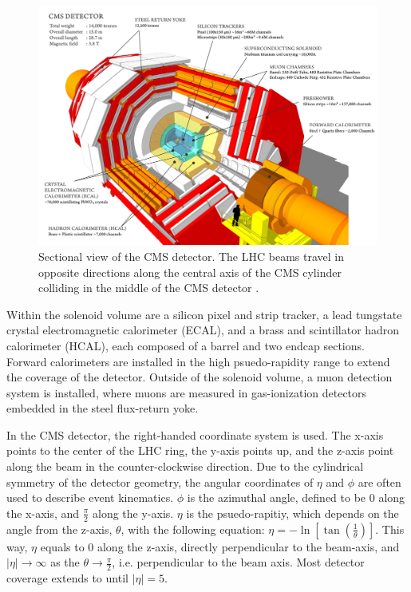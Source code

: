 \begin{figure}
    \begin{minipage}[t]{\linewidth}\centering
        \includegraphics[width=15cm]{cms_detector.png}
    \end{minipage}
    \caption{Sectional view of the CMS detector. The LHC beams travel in opposite directions 
    along the central axis of the CMS cylinder colliding in the middle of the CMS detector \cite{detector:cms_overall}.}
    \label{fig:cms_overall_diagram}
\end{figure}

Within the solenoid volume are a silicon pixel and strip tracker, a lead tungstate crystal electromagnetic calorimeter (ECAL), 
and a brass and scintillator hadron calorimeter (HCAL), each composed of a barrel and two endcap sections. Forward calorimeters
are installed in the high psuedo-rapidity range to extend the coverage of the detector. Outside of the solenoid volume,
a muon detection system is installed, where muons are measured in gas-ionization detectors embedded in the steel flux-return yoke.

In the CMS detector, the right-handed coordinate system is used. The x-axis points to the center of the LHC ring, the y-axis points up, 
and the z-axis point along the beam in the counter-clockwise direction. Due to the cylindrical symmetry of the detector geometry, the angular
coordinates of $\eta$ and $\phi$ are often used to describe event kinematics. $\phi$ is the azimuthal angle, defined to be 0 along the x-axis,
and $\frac{\pi}{2}$ along the y-axis. $\eta$ is the psuedo-rapitiy, which depends on the angle from the z-axis, $\theta$, with the following
equation: $\eta = -\ln[{\tan({\frac{1}{\theta}})}]$. This way, $\eta$ equals to 0 along the z-axis, directly perpendicular to the beam-axis,
and $|\eta| \rightarrow \infty$ as the $\theta \rightarrow \frac{\pi}{2}$, i.e. perpendicular to the beam axis. Most detector coverage
extends to until $|\eta| = 5$. 

